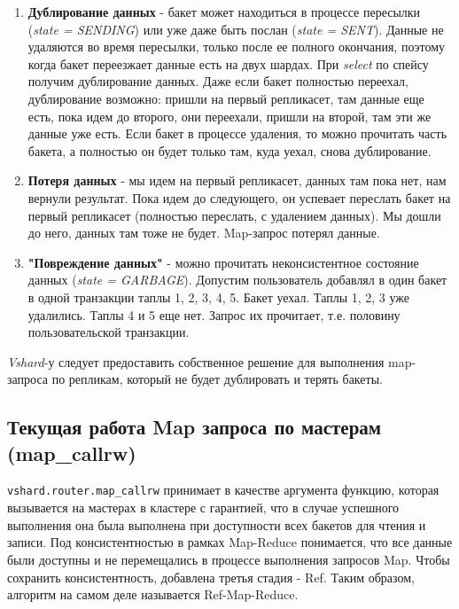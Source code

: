 \begin{enumerate}
\item \textbf{Дублирование данных} - бакет может находиться в процессе
    пересылки (\textit{state = SENDING}) или уже даже быть послан
        (\textit{state = SENT}). Данные не удаляются во время пересылки, только
        после ее полного окончания, поэтому когда бакет переезжает данные есть
        на двух шардах. При \textit{select} по спейсу получим дублирование
        данных. Даже если бакет полностью переехал, дублирование возможно:
        пришли на первый репликасет, там данные еще есть, пока идем до второго,
        они переехали, пришли на второй, там эти же данные уже есть. Если бакет
        в процессе удаления, то можно прочитать часть бакета, а полностью он
        будет только там, куда уехал, снова дублирование.

\item \textbf{Потеря данных} - мы идем на первый репликасет, данных там пока
    нет, нам вернули результат. Пока идем до следующего, он успевает переслать
        бакет на первый репликасет (полностью переслать, с удалением данных).
        Мы дошли до него, данных там тоже не будет. Map-запрос потерял данные.

\item \textbf{"Повреждение данных"} - можно прочитать неконсистентное состояние
    данных (\textit{state = GARBAGE}). Допустим пользователь добавлял в один
        бакет в одной транзакции таплы 1, 2, 3, 4, 5. Бакет уехал. Таплы 1, 2,
        3 уже удалились. Таплы 4 и 5 еще нет. Запрос их прочитает, т.е.
        половину пользовательской транзакции.

\end{enumerate}

\textit{Vshard}-у следует предоставить собственное решение для выполнения
map-запроса по репликам, который не будет дублировать и терять бакеты.

\subsection{Текущая работа Map запроса по мастерам (map_callrw)}

\texttt{vshard.router.map_callrw} принимает в качестве аргумента функцию,
которая вызывается на мастерах в кластере с гарантией, что в случае успешного
выполнения она была выполнена при доступности всех бакетов для чтения и записи.
Под консистентностью в рамках Map-Reduce понимается, что все данные были
доступны и не перемещались в процессе выполнения запросов Map. Чтобы сохранить
консистентность, добавлена третья стадия - Ref. Таким образом, алгоритм на
самом деле называется Ref-Map-Reduce.

